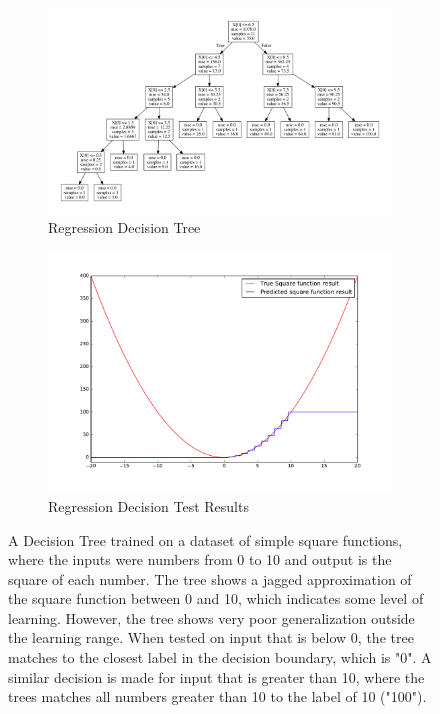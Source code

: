 \begin{figure}[!h]
  \centering
    \begin{subfigure}{0.49\textwidth}
        \centering
        \includegraphics[width=\linewidth]{figures/reg_tree.pdf}
        \caption{Regression Decision Tree}
    \end{subfigure}
    \begin{subfigure}{0.49\textwidth}
        \centering
        \includegraphics[width=\linewidth]{figures/reg_tree_plot.pdf}
        \caption{Regression Decision Test Results}
    \end{subfigure}
  \caption{A Decision Tree trained on a dataset of simple square functions, where the inputs were numbers from 0 to 10 and output is the square of each number. The tree shows a jagged approximation of the square function between 0 and 10, which indicates some level of learning. However, the tree shows very poor generalization outside the learning range. When tested on input that is below 0, the tree matches to the closest label in the decision boundary, which is "0". A similar decision is made for input that is greater than 10, where the trees matches all numbers greater than 10 to the label of 10 ("100").}
  \label{fig:decision_tree_regression_and_classification}
\end{figure}

